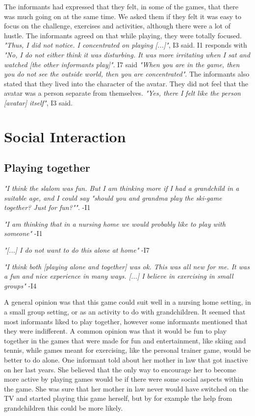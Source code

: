 The informants had expressed that they felt, in some of the games, that there was much going on at the same time. We asked them if they felt it was easy to focus on the challenge, exercises and activities, although there were a lot of hustle. The informants agreed on that while playing, they were totally focused. \emph{"Thus, I did not notice. I concentrated on playing [...]"}, I3 said. I1 responds with \emph{"No, I do not either think it was disturbing. It was more irritating when I sat and watched [the other informants play]"}. I7 said \emph{"When you are in the game, then you do not see the outside world, then you are concentrated"}. The informants also stated that they lived into the character of the avatar. They did not feel that the avatar was a person separate from themselves. \emph{"Yes, there I felt like the person [avatar] itself"}, I3 said.    

\section{Social Interaction}
\subsection{Playing together}
\emph{"I think the slalom was fun. But I am thinking more if I had a grandchild in a suitable age, and I could say "should you and grandma play the ski-game together? Just for fun?""}. -I1

\emph{"I am thinking that in a nursing home we would probably like to play with someone"} -I1

\emph{"[...] I do not want to do this alone at home"} -I7

\emph{"I think both [playing alone and together] was ok. This was all new for me. It was a fun and nice experience in many ways. [...] I believe in  exercising in small groups"} -I4

A general opinion was that this game could suit well in a nursing home setting, in a small group setting, or as an activity to do with grandchildren. It seemed that most informants liked to play together, however some informants mentioned that they were indifferent. A common opinion was that it would be fun to play together in the games that were made for fun and entertainment, like skiing and tennis, while games meant for exercising, like the personal trainer game, would be better to do alone. One informant told about her mother in law that got inactive on her last years. She believed that the only way to encourage her to become more active by playing games would be if there were some social aspects within the game. She was sure that her mother in law never would have switched on the TV and started playing this game herself, but by for example the help from grandchildren this could be more likely.

